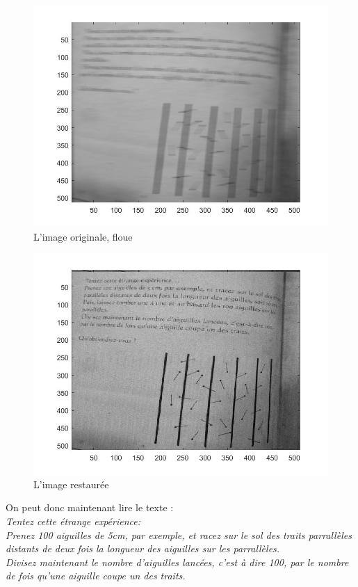 \documentclass[10pt,a4paper]{article}
\begin{document}
\begin{figure}[H]	\begin{center}
\includegraphics[scale=0.35]{im_floue.jpg}
\caption{L'image originale, floue}
\label{XX}
\end{center}	\end{figure}

\begin{figure}[H]	\begin{center}
\includegraphics[scale=0.35]{im_restauree.jpg}
\caption{L'image restaurée}
\label{XX}
\end{center}	\end{figure}

On peut donc maintenant lire le texte : 
\textit{\\Tentez cette étrange expérience:\\
Prenez 100 aiguilles de 5cm, par exemple, et racez sur le sol des traits parrallèles distants de deux fois la longueur des aiguilles sur les parrallèles.\\
Divisez maintenant le nombre d'aiguilles lancées, c'est à dire 100, par le nombre de fois qu'une aiguille coupe un des traits.}
\end{document}
